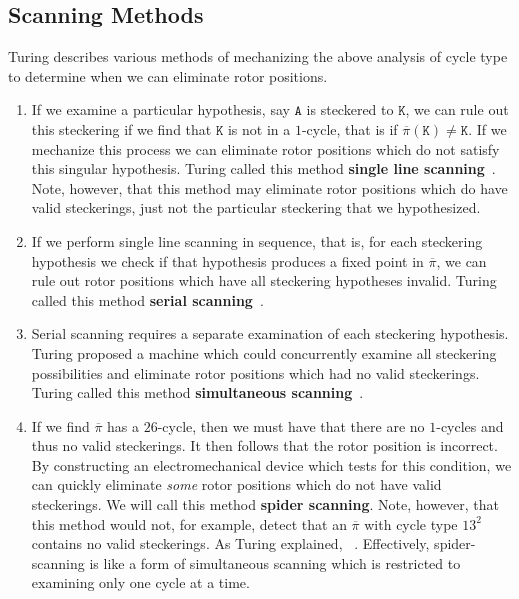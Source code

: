 \subsection{Scanning Methods}
Turing describes various methods of mechanizing the above analysis of
cycle type to determine when we can eliminate rotor positions.
\begin{enumerate}
  \item If we examine a particular hypothesis, say $\texttt{A}$ is steckered
    to $\texttt{K}$, we can rule out this steckering if we find that
    $\texttt{K}$ is
    not in a $1$-cycle, that is if $\overline\pi(\texttt{K}) \ne
    \texttt{K}$. If we
    mechanize this process we can eliminate rotor positions which do
    not satisfy this singular hypothesis. Turing called this method
    \textbf{single line scanning}~\cite[p.~104]{Turing1940ProfBook}. Note, however, that this method
    may eliminate rotor
    positions which do have valid steckerings, just not the
    particular steckering that we hypothesized.
  \item If we perform single line scanning in sequence, that is, for
    each steckering hypothesis we check if that hypothesis produces a
    fixed point in $\overline\pi$, we can rule out rotor positions which
    have all steckering hypotheses invalid. Turing called this method
    \textbf{serial scanning}~\cite[p.~104]{Turing1940ProfBook}.
  \item Serial scanning requires a separate examination of each
    steckering hypothesis. Turing proposed a machine which could concurrently
    examine all steckering possibilities and eliminate rotor positions
    which had no valid steckerings. Turing called this method
    \textbf{simultaneous scanning}~\cite[p.~104]{Turing1940ProfBook}.
  \item If we find $\overline\pi$ has a $26$-cycle, then we must
    have that there are no $1$-cycles and thus no valid steckerings.
    It then follows that the rotor position is incorrect.
    By constructing an electromechanical device which tests for this condition, we can quickly eliminate \emph{some} rotor
    positions which do not have valid steckerings. We will call this
    method \textbf{spider scanning}. Note, however, that this method
    would not, for example, detect that an $\overline\pi$ with cycle
    type ${13}^2$ contains no
    valid steckerings. As Turing explained,
    ~\cite[p.~112]{Turing1940ProfBook}. Effectively, spider-scanning is like a form of
    simultaneous scanning which is restricted
    to examining only one cycle at a time.
\end{enumerate}
